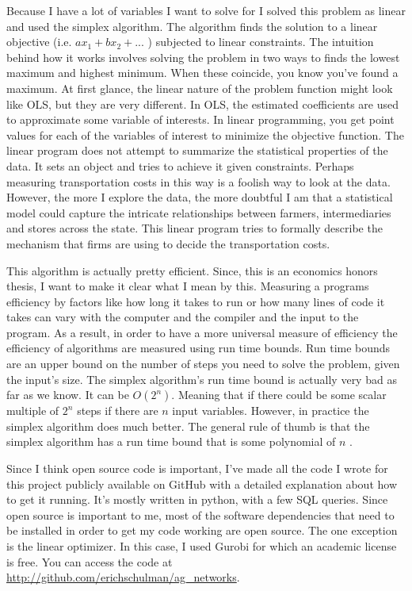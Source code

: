 \documentclass{report}
\begin{document}
Because I have a lot of variables I want to solve for I solved this problem as linear and used the simplex algorithm. The algorithm finds the solution to a linear objective (i.e. $a x_1 +b x_2 + ...$ ) subjected to linear constraints. The intuition behind how it works involves solving the problem in two ways to finds the lowest maximum and highest minimum. When these coincide,  you know you've found a maximum. At first glance, the  linear nature of the problem function might look like OLS, but they are very different. In OLS, the estimated coefficients are used to approximate some variable of interests. In linear programming, you get point values for each of the variables of interest to minimize the objective function. The linear program does not attempt to summarize the statistical properties of the data. It sets an object and tries to achieve it given constraints. Perhaps measuring transportation costs in this way is a foolish way to look at the data. However, the more I explore the data, the more doubtful I am that a statistical model could capture the intricate relationships between farmers, intermediaries and stores across the state. This linear program tries to formally describe the mechanism that firms are using to decide the transportation costs.

This algorithm is actually pretty efficient. Since, this is an economics honors thesis, I want to make it clear what I mean by this. Measuring a programs efficiency by factors like how long it takes to run or how many lines of code it takes can vary with the computer and the compiler and the input to the program. As a result, in order to have a more universal measure of efficiency the efficiency of algorithms are measured using run time bounds. Run time bounds are an upper bound on the number of steps you need to solve the problem, given the input's size.  The simplex algorithm's run time bound is actually very bad as far as we know. It can be $O(2^n)$. Meaning that if there could be some scalar multiple of $2^n$ steps if there are $n$ input variables. However, in practice the simplex algorithm does much better. The general rule of thumb is that the simplex algorithm has a run time bound that is some polynomial of $n$ \cite{Cook}.

Since I think open source code is important, I've made all the code I wrote for this project publicly available on GitHub with a detailed explanation about how to get it running. It's mostly written in python, with a few SQL queries. Since open source is important to me, most of the software dependencies that need to be installed in order to get my code working are open source. The one exception is the linear optimizer. In this case, I used Gurobi for which an academic license is free. You can access the code at \url{http://github.com/erichschulman/ag_networks}.
\end{document}
